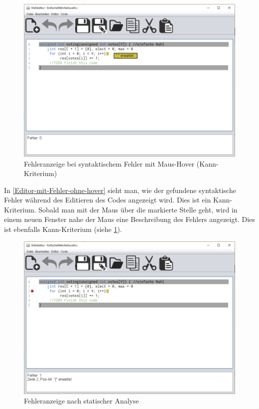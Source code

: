\documentclass[a4paper]{scrreprt}
\begin{document}
\begin{figure}[H]
\includegraphics[scale=0.4]{Editor-mit-Fehler-mit-hover.png}
\caption{Fehleranzeige bei syntaktischem Fehler mit Maus-Hover (Kann-Kriterium)}
\label{Editor-mit-Fehler-mit-hover}
\end{figure}

In \ref{Editor-mit-Fehler-ohne-hover} sieht man, wie der gefundene syntaktische Fehler während des Editieren des Codes angezeigt wird. Dies ist ein Kann-Kriterium. Sobald man mit der Maus über die markierte Stelle geht, wird in einem neuen Fenster nahe der Maus eine Beschreibung des Fehlers angezeigt. Dies ist ebenfalls Kann-Kriterium (siehe \ref{Editor-mit-Fehler-mit-hover}).

\begin{figure}[H]
\includegraphics[scale=0.4]{Editor-mit-Fehler-nach-statischer-analyse.png}
\caption{Fehleranzeige nach statischer Analyse}
\label{Editor-mit-Fehler-nach-statischer-analyse}
\end{figure}
\end{document}
